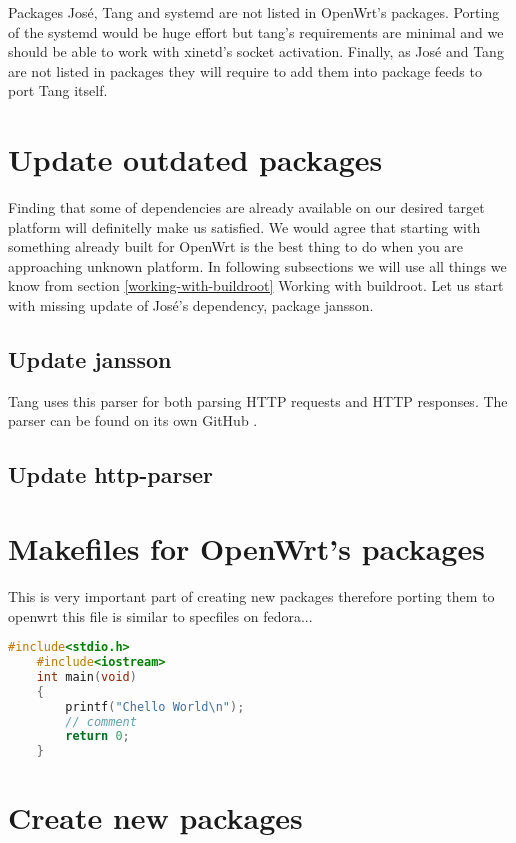 Packages José, Tang and systemd are not listed in OpenWrt's packages.
Porting of the systemd would be huge effort but tang's requirements are minimal and we should be able to work with xinetd's socket activation.
Finally, as José and Tang are not listed in packages they will require to add them into package feeds to port Tang itself.

\section{Update outdated packages}

Finding that some of dependencies are already available on our desired target platform will definitelly make us satisfied.
We would agree that starting with something already built for OpenWrt is the best thing to do when you are approaching unknown platform.
In following subsections we will use all things we know from section \ref{working-with-buildroot} Working with buildroot.
Let us start with missing update of José's dependency, package jansson.

\subsection{Update jansson}\label{jansson}
Tang uses this parser for both parsing HTTP requests and HTTP responses.
The parser can be found on its own GitHub \cite{http-parser}.
\newpage

\subsection{Update http-parser}\label{http-parser}

\section{Makefiles for OpenWrt's packages}

This is very important part of creating new packages therefore porting them to openwrt this file is similar to specfiles on fedora...

\begin{lstlisting}[language=c,basicstyle=\ttfamily\footnotesize,label=c,caption=Basic C code.]
    #include<stdio.h>
    #include<iostream>
    int main(void)
    {
        printf("Chello World\n");
        // comment
        return 0;
    }
\end{lstlisting}

\newpage

\section{Create new packages}

